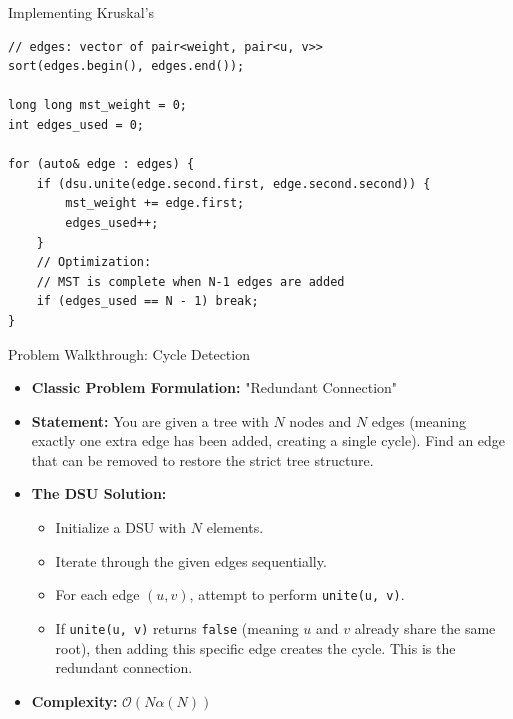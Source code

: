 \documentclass{beamer}
\begin{document}
\begin{frame}[fragile]{Implementing Kruskal's}
\begin{verbatim}
// edges: vector of pair<weight, pair<u, v>>
sort(edges.begin(), edges.end());

long long mst_weight = 0;
int edges_used = 0;

for (auto& edge : edges) {
    if (dsu.unite(edge.second.first, edge.second.second)) {
        mst_weight += edge.first;
        edges_used++;
    }
    // Optimization: 
    // MST is complete when N-1 edges are added
    if (edges_used == N - 1) break; 
}
\end{verbatim}
\end{frame}

\begin{frame}{Problem Walkthrough: Cycle Detection}
    \begin{itemize}
        \item \textbf{Classic Problem Formulation:} "Redundant Connection"
        \item \textbf{Statement:} You are given a tree with $N$ nodes and $N$ edges (meaning exactly one extra edge has been added, creating a single cycle). Find an edge that can be removed to restore the strict tree structure.
        \item \textbf{The DSU Solution:}
        \begin{itemize}
            \item Initialize a DSU with $N$ elements.
            \item Iterate through the given edges sequentially.
            \item For each edge $(u, v)$, attempt to perform \texttt{unite(u, v)}.
            \item If \texttt{unite(u, v)} returns \texttt{false} (meaning $u$ and $v$ already share the same root), then adding this specific edge creates the cycle. This is the redundant connection.
        \end{itemize}
        \item \textbf{Complexity:} $\mathcal{O}(N \alpha(N))$
    \end{itemize}
\end{frame}
\end{document}
